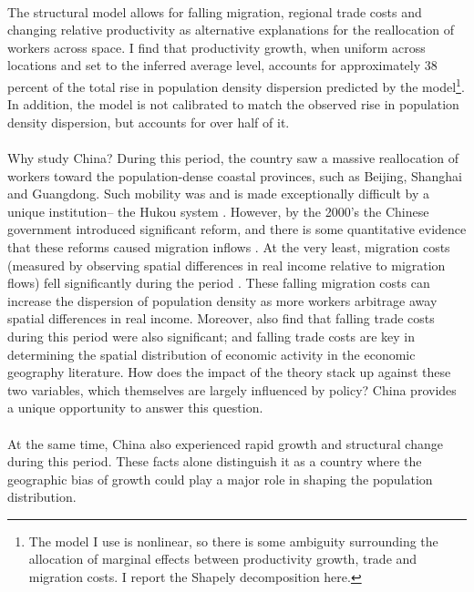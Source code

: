 \documentclass[]{article}
\theoremstyle{plain}
\begin{document}
\paragraph*{}
The structural model allows for falling migration, regional trade costs and changing relative productivity as alternative explanations for the reallocation of workers across space. I find that productivity growth, when uniform across locations and set to the inferred average level, accounts for approximately 38 percent of the total rise in population density dispersion predicted by the model\footnote{The model I use is nonlinear, so there is some ambiguity surrounding the allocation of marginal effects between productivity growth, trade and migration costs. I report the Shapely decomposition here.}. In addition, the model is not calibrated to match the observed rise in population density dispersion, but accounts for over half of it.
 \paragraph*{}
 Why study China? During this period, the country saw a massive reallocation of workers toward the population-dense coastal provinces, such as Beijing, Shanghai and Guangdong. Such mobility was and is made exceptionally difficult by a unique institution-- the Hukou system \citep{Chinashukou60} \citep{hukoulaboutcome}. However, by the 2000's the Chinese government introduced significant reform, and there is some quantitative evidence that these reforms caused migration inflows \citep{Fan2018HukouRI}. At the very least, migration costs (measured by observing spatial differences in real income relative to migration flows) fell significantly during the period \citep{tombezhu}. These falling migration costs can increase the dispersion of population density as more workers arbitrage away spatial differences in real income. Moreover, \citet{tombezhu} also find that falling trade costs during this period were also significant; and falling trade costs are key in determining the spatial distribution of economic activity in the economic geography literature. How does the impact of the theory stack up against these two variables, which themselves are largely influenced by policy? China provides a unique opportunity to answer this question.
 \paragraph*{}
 At the same time, China also experienced rapid growth and structural change during this period.  These facts alone distinguish it as a country where the geographic bias of growth could play a major role in shaping the population distribution.
\end{document}

